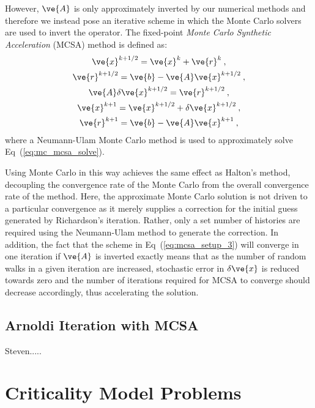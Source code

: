 \documentclass[letterpaper,11pt]{article}
\begin{document}
However, $\ve{A}$ is only approximately inverted by our numerical
methods and therefore we instead pose an iterative scheme in which the
Monte Carlo solvers are used to invert the operator. The fixed-point
\textit{Monte Carlo Synthetic Acceleration} (MCSA) method is defined
as:
\begin{subequations}
  \begin{gather}
    \ve{x}^{k+1/2} = \ve{x}^k + \ve{r}^k\:,\\
    \ve{r}^{k+1/2} = \ve{b} - \ve{A}\ve{x}^{k+1/2}\:,\\
    \label{eq:mc_mcsa_solve}
    \ve{A}\delta\ve{x}^{k+1/2} = \ve{r}^{k+1/2}\:,\\
    \ve{x}^{k+1} = \ve{x}^{k+1/2} + \delta \ve{x}^{k+1/2}\:,\\
    \ve{r}^{k+1} = \ve{b} - \ve{A}\ve{x}^{k+1}\:,
  \end{gather}
  \label{eq:mcsa}
\end{subequations}
where a Neumann-Ulam Monte Carlo method is used to approximately solve
Eq~(\ref{eq:mc_mcsa_solve}).

Using Monte Carlo in this way achieves the same effect as Halton's
method, decoupling the convergence rate of the Monte Carlo from the
overall convergence rate of the method. Here, the approximate Monte
Carlo solution is not driven to a particular convergence as it merely
supplies a correction for the initial guess generated by Richardson's
iteration. Rather, only a set number of histories are required using
the Neumann-Ulam method to generate the correction. In addition, the
fact that the scheme in Eq~(\ref{eq:mcsa_setup_3}) will converge in
one iteration if $\ve{A}$ is inverted exactly means that as the number
of random walks in a given iteration are increased, stochastic error
in $\delta \ve{x}$ is reduced towards zero and the number of
iterations required for MCSA to converge should decrease accordingly,
thus accelerating the solution.

\subsection{Arnoldi Iteration with MCSA}

Steven.....

\section{Criticality Model Problems}
\end{document}
